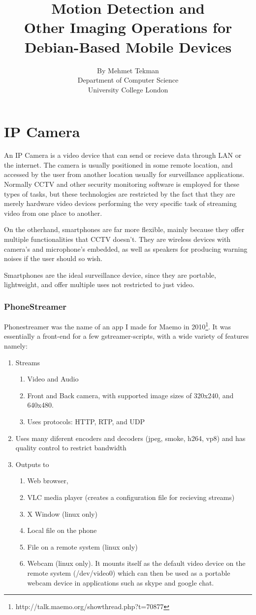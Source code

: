 \documentclass[11pt]{article} %
\title{\Huge Motion Detection and\\Other Imaging Operations for\\Debian-Based Mobile Devices }
\author{\small By Mehmet Tekman\\\small Department of Computer Science\\\small University College London}
\begin{document}
\part{IP Camera}

An IP Camera is a video device that can send or recieve data through LAN or the internet. The camera is usually positioned in some remote location, and accessed by the user from another location usually for surveillance applications.  Normally CCTV and other security monitoring software is employed for these types of tasks, but these technologies are restricted by the fact that they are merely hardware video devices performing the very specific task of streaming video from one place to another.

On the otherhand, smartphones are far more flexible, mainly because they offer multiple functionalities that CCTV doesn't. They are wireless devices with camera's and microphone's embedded, as well as speakers for producing warning noises if the user should so wish.

Smartphones are the ideal surveillance device, since they are portable, lightweight, and offer multiple uses not restricted to just video.

\section{PhoneStreamer}

Phonestreamer was the name of an app I made for Maemo in 2010\footnote{http://talk.maemo.org/showthread.php?t=70877}. It was essentially a front-end for a few gstreamer-scripts, with a wide variety of features namely:
\begin{enumerate}
\item Streams
	\begin{enumerate}
	\item Video and Audio
	\item Front and Back camera, with supported image sizes of 320x240, and 640x480.
	\item Uses protocols: HTTP, RTP, and UDP
	\end{enumerate}
\item Uses many diferent encoders and decoders (jpeg, smoke, h264, vp8)  and has quality control to restrict bandwidth
\item Outputs to
	\begin{enumerate}
	\item Web browser,
	\item VLC media player (creates a configuration file for recieving streams)
	\item X Window (linux only)
	\item Local file on the phone
	\item File on a remote system (linux only)
	\item Webcam (linux only). It mounts itself as the default video device on the remote system (/dev/video0) which can then be used as a portable webcam device in applications such as skype and google chat.
	\end{enumerate}
\end{enumerate}
\end{document}
